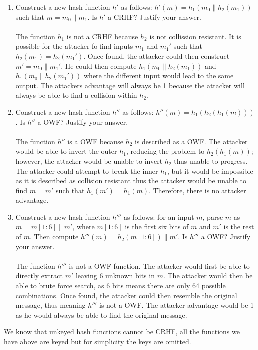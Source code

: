 \documentclass[12pt]{article}
\newcommand*\concat{\mathbin{\|}}
\begin{document}
\begin{enumerate}
    \item Construct a new hash function $h'$ as follows: $h'(m) = h_1(m_0 \concat h_2(m_1))$ such that $m = m_0 \concat m_1$. Is $h'$ a CRHF? Justify your answer.
    \\\\The function $h_1$ is not a CRHF because $h_2$ is not collission resistant. It is possible for the attacker fo find inputs $m_1$ and $m_1'$ such that $h_2(m_1) = h_2(m_1')$. Once found, the attacker could then construct $m' = m_0 \concat m_1'$. He could then compute $h_1(m_0 \concat h_2(m_1))$ and $h_1(m_0 \concat h_2(m_1'))$ where the different input would lead to the same output. The attackers advantage will always be 1 because the attacker will always be able to find a collision within $h_2$.
    \item Construct a new hash function $h''$ as follows: $h''(m) = h_1(h_2(h_1(m)))$. Is $h''$ a OWF? Justify your answer.
    \\\\The function $h''$ is a OWF because $h_2$ is described as a OWF. The attacker would be able to invert the outer $h_1$, reducing the problem to $h_2(h_1(m))$; however, the attacker would be unable to invert $h_2$ thus unable to progress. The attacker could attempt to break the inner $h_1$, but it would be impossible as it is described as collision resistant thus the attacker would be unable to find $m = m'$ such that $h_1(m') = h_1(m)$. Therefore, there is no attacker advantage.
    \item Construct a new hash function $h'''$ as follows: for an input $m$, parse $m$ as $m = m[1:6] \concat m'$, where $m[1:6]$ is the first six bits of $m$ and $m'$ is the rest of $m$. Then compute $h'''(m) = h_2(m[1:6]) \concat m'$. Is $h'''$ a OWF? Justify your answer.
    \\\\The function $h'''$ is not a OWF function. The attacker would first be able to directly extract $m'$ leaving 6 unknown bits in $m$. The attacker would then be able to brute force search, as 6 bits means there are only 64 possible combinations. Once found, the attacker could then resemble the original message, thus meaning $h'''$ is not a OWF. The attacker advantage would be 1 as he would always be able to find the original message.  
\end{enumerate}

 We know that unkeyed hash functions cannot be CRHF, all the functions we have above are keyed but for simplicity the keys are omitted. \\
\end{document}
